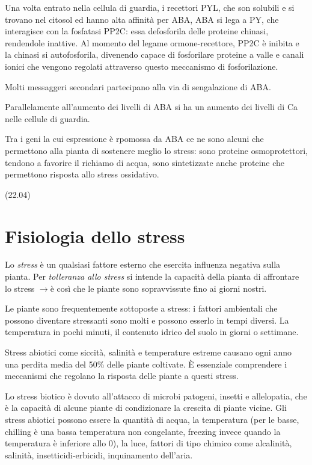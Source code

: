 \documentclass[a4paper,12pt]{book}
\newcommand{\lfreccia}{\ensuremath{\longrightarrow}}
\begin{document}
Una volta entrato nella cellula di guardia, i recettori PYL, che son solubili e si trovano nel citosol ed hanno alta affinità per ABA, ABA si lega a PY, che interagisce con la fosfatasi PP2C: essa defosforila delle proteine chinasi, rendendole inattive. Al momento del legame ormone-recettore, PP2C è inibita e la chinasi si autofosforila, divenendo capace di fosforilare proteine a valle e canali ionici che vengono regolati attraverso questo meccanismo di fosforilazione.

Molti messaggeri secondari partecipano alla via di sengalazione di ABA.

Parallelamente all'aumento dei livelli di ABA si ha un aumento dei livelli di Ca nelle cellule di guardia.

Tra i geni la cui espressione è rpomossa da ABA ce ne sono alcuni che permettono alla pianta di sostenere meglio lo stress: sono proteine osmoprotettori, tendono a favorire il richiamo di acqua, sono sintetizzate anche proteine che permettono risposta allo stress ossidativo.

(22.04)
\chapter{Fisiologia dello stress}
Lo \emph{stress} è un qualsiasi fattore esterno che esercita influenza negativa sulla pianta. Per \emph{tolleranza allo stress} si intende la capacità della pianta di affrontare lo stress \lfreccia è così che le piante sono sopravvissute fino ai giorni nostri.

Le piante sono frequentemente sottoposte a stress: i fattori ambientali che possono diventare stressanti sono molti e possono esserlo in tempi diversi. La temperatura in pochi minuti, il contenuto idrico del suolo in giorni o settimane.

Stress abiotici come siccità, salinità e temperature estreme causano ogni anno una perdita media del 50\% delle piante coltivate. È essenziale comprendere i meccanismi che regolano la risposta delle piante a questi stress.

Lo stress biotico è dovuto all'attacco di microbi patogeni, insetti e allelopatia, che è la capacità di alcune piante di condizionare la crescita di piante vicine. Gli stress abiotici possono essere la quantità di acqua, la temperatura (per le basse, chilling è una bassa temperatura non congelante, freezing invece quando la temperatura è inferiore allo 0), la luce, fattori di tipo chimico come alcalinità, salinità, insetticidi-erbicidi, inquinamento dell'aria.
\end{document}
